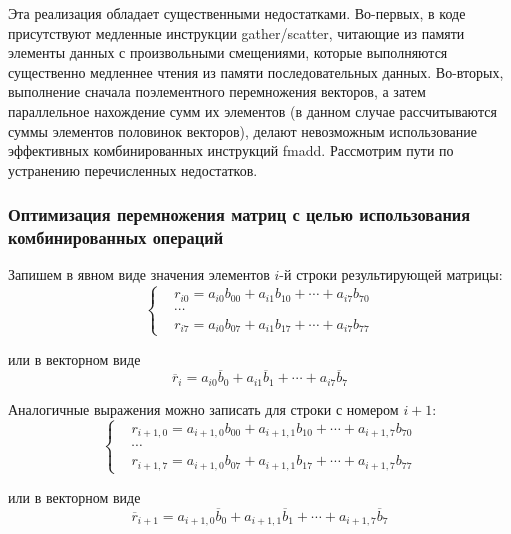 Эта реализация обладает существенными недостатками.
Во-первых, в коде присутствуют медленные инструкции gather/scatter, читающие из памяти элементы данных с произвольными смещениями, которые выполняются существенно медленнее чтения из памяти последовательных данных.
Во-вторых, выполнение сначала поэлементного перемножения векторов, а затем параллельное нахождение сумм их элементов (в данном случае рассчитываются суммы элементов половинок векторов), делают невозможным использование эффективных комбинированных инструкций fmadd.
Рассмотрим пути по устранению перечисленных недостатков.

\subsubsection{Оптимизация перемножения матриц с целью использования комбинированных операций}

Запишем в явном виде значения элементов $i$-й строки результирующей матрицы:
\begin{equation}
	\left\{
		\begin{aligned}
			& r_{i0} = a_{i0}b_{00} + a_{i1}b_{10} + \cdots + a_{i7}b_{70} \\
			& \cdots \\
			& r_{i7} = a_{i0}b_{07} + a_{i1}b_{17} + \cdots + a_{i7}b_{77}
		\end{aligned}
	\right.
\end{equation}

или в векторном виде
\begin{equation}\label{eqn:text_4_spec_matr_ri}
	\overline{r}_i = a_{i0}\overline{b}_0 + a_{i1}\overline{b}_1 + \cdots + a_{i7}\overline{b}_7
\end{equation}

Аналогичные выражения можно записать для строки с номером $i + 1$:
\begin{equation}
	\left\{
		\begin{aligned}
			& r_{i + 1,0} = a_{i + 1,0}b_{00} + a_{i + 1,1}b_{10} + \cdots + a_{i + 1,7}b_{70} \\
			& \cdots \\
			& r_{i + 1,7} = a_{i + 1,0}b_{07} + a_{i + 1,1}b_{17} + \cdots + a_{i + 1,7}b_{77}
		\end{aligned}
	\right.
\end{equation}

или в векторном виде
\begin{equation}\label{eqn:text_4_spec_matr_rip1}
	\overline{r}_{i + 1} = a_{i + 1,0}\overline{b}_0 + a_{i + 1,1}\overline{b}_1 + \cdots + a_{i + 1,7}\overline{b}_7
\end{equation}

